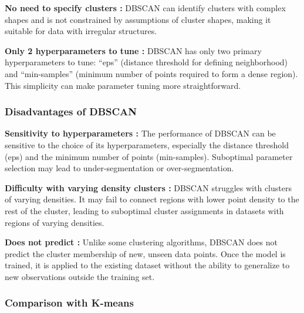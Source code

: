 \par \textbf{No need to specify clusters : }DBSCAN can identify clusters with complex shapes and is not constrained by assumptions of cluster shapes, making it suitable for data with irregular structures.

\par \textbf{Only 2 hyperparameters to tune : } DBSCAN has only two primary hyperparameters to tune: “eps” (distance threshold for defining neighborhood) and “min-samples” (minimum number of points required to form a dense region). This simplicity can make parameter tuning more straightforward.

\subsubsection{Disadvantages of DBSCAN}


\textbf{Sensitivity to hyperparameters : } The performance of DBSCAN can be sensitive to the choice of its hyperparameters, especially the distance threshold (eps) and the minimum number of points (min-samples). Suboptimal parameter selection may lead to under-segmentation or over-segmentation.

\textbf{Difficulty with varying density clusters : }DBSCAN struggles with clusters of varying densities. It may fail to connect regions with lower point density to the rest of the cluster, leading to suboptimal cluster assignments in datasets with regions of varying densities.

\textbf{Does not predict : } Unlike some clustering algorithms, DBSCAN does not predict the cluster membership of new, unseen data points. Once the model is trained, it is applied to the existing dataset without the ability to generalize to new observations outside the training set.


\subsubsection{Comparison with K-means}


